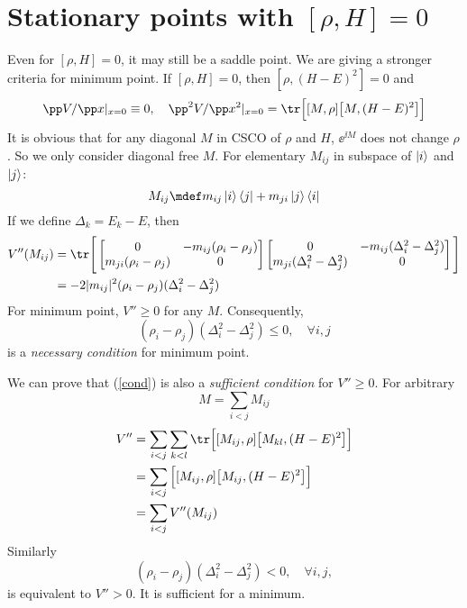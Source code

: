 \documentclass[10pt]{article}
\begin{document}
\section{Stationary points with \texorpdfstring{$[\rho, H]=0$}{[rho, H]=0}}
Even for $[\rho, H]=0$, it may still be a saddle point. We are giving a stronger criteria for minimum point. If $[\rho, H]=0$, then $[\rho, (H-E)^2]=0$ and
\begin{equation}
\pp V/\pp x|_{x=0}\equiv 0,\quad \pp^2 V/\pp x^2|_{x=0}=\tr \Big[[M,\rho]\big[M, (H-E)^2\big]\Big]
\end{equation}
It is obvious that for any diagonal $M$ in CSCO of $\rho$ and $H$, $\ee^{\ii M}$ does not change $\rho$. So we only consider diagonal free $M$. For elementary $M_{ij}$ in subspace of $\ket{i}$ and $\ket{j}$:
\[M_{ij}\mdef m_{ij}\ket i\bra j+m_{ji}\ket j\bra i\]
If we define $\Delta_k=E_k-E$, then 
\begin{align}
V''(M_{ij})&=\tr \Bigg[\begin{bmatrix}
0 &-m_{ij}(\rho_i-\rho_j)\\
m_{ji}(\rho_i-\rho_j) &0
\end{bmatrix}\begin{bmatrix}
0 &-m_{ij}(\Delta_i^2-\Delta_j^2)\\
m_{ji}(\Delta_i^2-\Delta_j^2) &0
\end{bmatrix}\Bigg]\\
&=-2|m_{ij}|^2(\rho_i-\rho_j)(\Delta_i^2-\Delta_j^2)
\end{align}
For minimum point, $V''\geq 0$ for any $M$. Consequently,
\begin{equation}
(\rho_i-\rho_j)(\Delta_i^2-\Delta_j^2)\leq0,\quad \forall i,j\label{cond}
\end{equation}
is a \emph{necessary condition} for minimum point. 

We can prove that (\ref{cond}) is also a \emph{sufficient condition} for $V''\geq 0$. For arbitrary
\begin{equation}
M=\sum_{i<j} M_{ij}
\end{equation}
\begin{align}
V''&=\sum_{i<j}\sum_{k<l}\tr \Big[[M_{ij},\rho]\big[M_{kl}, (H-E)^2\big]\Big]\\
&=\sum_{i<j} \Big[[M_{ij},\rho]\big[M_{ij}, (H-E)^2\big]\Big]\\
&=\sum_{i<j} V''(M_{ij})
\end{align}
Similarly
\begin{equation}
(\rho_i-\rho_j)(\Delta_i^2-\Delta_j^2)< 0,\quad \forall i,j\label{cond2},
\end{equation}
is equivalent to $V''>0$. It is sufficient for a minimum.
\end{document}
